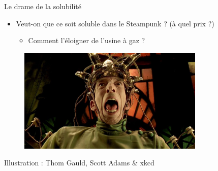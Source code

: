 \documentclass[newPxFont]{beamer}
\begin{document}
\begin{frame}[c]{Le drame de la solubilité}
  \vspace{-2em}
  \begin{itemize}
    \item Veut-on que ce soit soluble dans le Steampunk ? (à quel prix ?)
    \begin{itemize}
      \item Comment l'éloigner de l'usine à gaz ?
    \end{itemize}
  \end{itemize}

  \begin{figure}
   \includegraphics[height=5cm]{img/La_Cite_des_enfants_perdus.jpg}
  \end{figure}
\end{frame}

%
%

{
%
\begin{frame}
  \begin{minipage}[t][.8\textheight]{\textwidth}

    \vfill

    \hfill {}

    \hfill \small{Illustration : Thom Gauld, Scott Adams \& xkcd}
  \end{minipage}

\end{frame}
}

\end{document}
